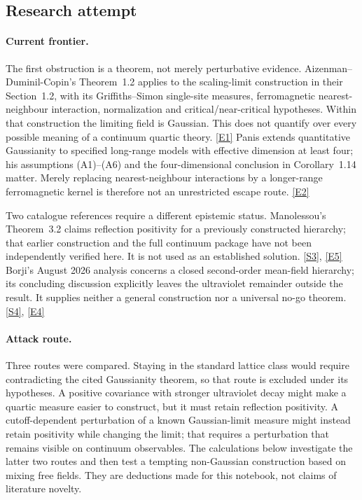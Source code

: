 \documentclass[11pt]{article}
\newcommand{\sref}[2]{\hyperlink{source:#1:#2}{[S#2]}}
\newcommand{\eref}[2]{\hyperlink{extra:#1:#2}{[E#2]}}
\begin{document}
\subsection{Research attempt}

\paragraph{Current frontier.}
The first obstruction is a theorem, not merely perturbative evidence.
Aizenman--Duminil-Copin's Theorem~1.2 applies to the scaling-limit
construction in their Section~1.2, with its Griffiths--Simon single-site
measures, ferromagnetic nearest-neighbour interaction, normalization and
critical/near-critical hypotheses. Within that construction the limiting
field is Gaussian. This does not quantify over every possible meaning of a
continuum quartic theory. \eref{statement}{1}
Panis extends quantitative Gaussianity to specified long-range models with
effective dimension at least four; his assumptions (A1)--(A6) and the
four-dimensional conclusion in Corollary~1.14 matter. Merely replacing
nearest-neighbour interactions by a longer-range ferromagnetic kernel is
therefore not an unrestricted escape route. \eref{statement}{2}

Two catalogue references require a different epistemic status. Manolessou's
Theorem~3.2 claims reflection positivity for a previously constructed
hierarchy; that earlier construction and the full continuum package have
not been independently verified here. It is not used as an established
solution. \sref{statement}{3}, \eref{statement}{5}
Borji's August 2026 analysis concerns a closed second-order mean-field
hierarchy; its concluding discussion explicitly leaves the ultraviolet
remainder outside the result. It supplies neither a general construction
nor a universal no-go theorem. \sref{statement}{4}, \eref{statement}{4}

\paragraph{Attack route.}
Three routes were compared. Staying in the standard lattice class would
require contradicting the cited Gaussianity theorem, so that route is
excluded under its hypotheses. A positive covariance with stronger
ultraviolet decay might make a quartic measure easier to construct, but it
must retain reflection positivity. A cutoff-dependent perturbation of a
known Gaussian-limit measure might instead retain positivity while changing
the limit; that requires a perturbation that remains visible on continuum
observables. The calculations below investigate the latter two routes and
then test a tempting non-Gaussian construction based on mixing free fields.
They are deductions made for this notebook, not claims of literature novelty.
\end{document}
